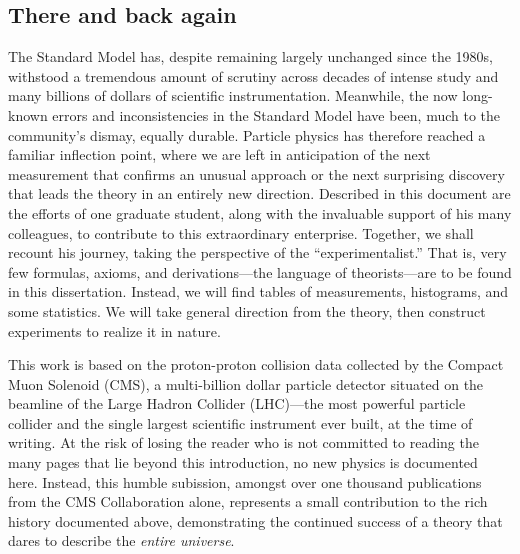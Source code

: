 \begin{dissertationintroduction}
\section*{There and back again}
The Standard Model has, despite remaining largely unchanged since the 1980s, withstood a tremendous amount of scrutiny across decades of intense study and many billions of dollars of scientific instrumentation. %
Meanwhile, the now long-known errors and inconsistencies in the Standard Model have been, much to the community's dismay, equally durable. %
Particle physics has therefore reached a familiar inflection point, where we are left in anticipation of the next measurement that confirms an unusual approach or the next surprising discovery that leads the theory in an entirely new direction. 
Described in this document are the efforts of one graduate student, along with the invaluable support of his many colleagues, to contribute to this extraordinary enterprise. 
Together, we shall recount his journey, taking the perspective of the ``experimentalist.'' 
That is, very few formulas, axioms, and derivations---the language of theorists---are to be found in this dissertation. 
Instead, we will find tables of measurements, histograms, and some statistics. 
We will take general direction from the theory, then construct experiments to realize it in nature. 

This work is based on the proton-proton collision data collected by the Compact Muon Solenoid (CMS), a multi-billion dollar particle detector situated on the beamline of the Large Hadron Collider (LHC)---the most powerful particle collider and the single largest scientific instrument ever built, at the time of writing. 
At the risk of losing the reader who is not committed to reading the many pages that lie beyond this introduction, no new physics is documented here.
Instead, this humble subission, amongst over one thousand publications from the CMS Collaboration alone, represents a small contribution to the rich history documented above, demonstrating the continued success of a theory that dares to describe the \textit{entire universe}.
\end{dissertationintroduction}

